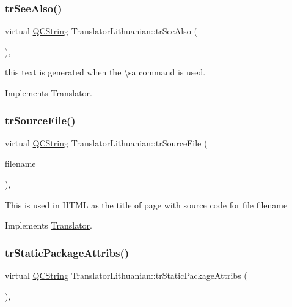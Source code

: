 \subsubsection{\texorpdfstring{trSeeAlso()}{trSeeAlso()}}
{\footnotesize\ttfamily virtual \mbox{\hyperlink{class_q_c_string}{Q\+C\+String}} Translator\+Lithuanian\+::tr\+See\+Also (\begin{DoxyParamCaption}{ }\end{DoxyParamCaption})\hspace{0.3cm}{\ttfamily [inline]}, {\ttfamily [virtual]}}

this text is generated when the \textbackslash{}sa command is used. 

Implements \mbox{\hyperlink{class_translator}{Translator}}.

\mbox{\label{class_translator_lithuanian_ae887ba8f5a4c523f18049445bce45d1f}} 
\subsubsection{\texorpdfstring{trSourceFile()}{trSourceFile()}}
{\footnotesize\ttfamily virtual \mbox{\hyperlink{class_q_c_string}{Q\+C\+String}} Translator\+Lithuanian\+::tr\+Source\+File (\begin{DoxyParamCaption}\item[{\mbox{\hyperlink{class_q_c_string}{Q\+C\+String}} \&}]{filename }\end{DoxyParamCaption})\hspace{0.3cm}{\ttfamily [inline]}, {\ttfamily [virtual]}}

This is used in H\+T\+ML as the title of page with source code for file filename 

Implements \mbox{\hyperlink{class_translator}{Translator}}.

\mbox{\label{class_translator_lithuanian_ab351f6b871ae8a133f30f183cd17fa0b}} 
\subsubsection{\texorpdfstring{trStaticPackageAttribs()}{trStaticPackageAttribs()}}
{\footnotesize\ttfamily virtual \mbox{\hyperlink{class_q_c_string}{Q\+C\+String}} Translator\+Lithuanian\+::tr\+Static\+Package\+Attribs (\begin{DoxyParamCaption}{ }\end{DoxyParamCaption})\hspace{0.3cm}{\ttfamily [inline]}, {\ttfamily [virtual]}}

